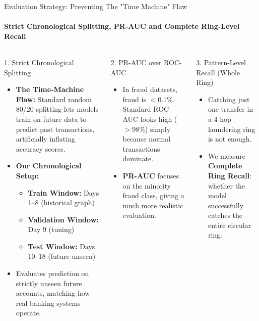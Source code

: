 \documentclass[aspectratio=169, 11pt]{beamer}
\begin{document}
\begin{frame}{Evaluation Strategy: Preventing The "Time Machine" Flaw}
    \framesubtitle{Strict Chronological Splitting, PR-AUC and Complete Ring-Level Recall}
    \begin{columns}[T]
        \begin{block}{1. Strict Chronological Splitting}
            \footnotesize
            \begin{itemize}\setlength{\itemsep}{2pt}
                \item \textbf{The Time-Machine Flaw:} Standard random 80/20 splitting lets models train on future data to predict past transactions, artificially inflating accuracy scores.
                \item \textbf{Our Chronological Setup:}
                \begin{itemize}\footnotesize
                    \item \textbf{Train Window:} Days 1--8 (historical graph)
                    \item \textbf{Validation Window:} Day 9 (tuning)
                    \item \textbf{Test Window:} Days 10--18 (future unseen)
                \end{itemize}
                \item Evaluates prediction on strictly unseen future accounts, matching how real banking systems operate.
            \end{itemize}
        \end{block}

        \begin{block}{2. PR-AUC over ROC-AUC}
            \footnotesize
            \begin{itemize}\setlength{\itemsep}{2pt}
                \item In fraud datasets, fraud is $<0.1\%$. Standard ROC-AUC looks high ($>98\%$) simply because normal transactions dominate.
                \item \textbf{PR-AUC} focuses on the minority fraud class, giving a much more realistic evaluation.
            \end{itemize}
        \end{block}

        \begin{block}{3. Pattern-Level Recall (Whole Ring)}
            \footnotesize
            \begin{itemize}\setlength{\itemsep}{2pt}
                \item Catching just one transfer in a 4-hop laundering ring is not enough.
                \item We measure \textbf{Complete Ring Recall}: whether the model successfully catches the entire circular ring.
            \end{itemize}
        \end{block}
    \end{columns}
\end{frame}
\end{document}
